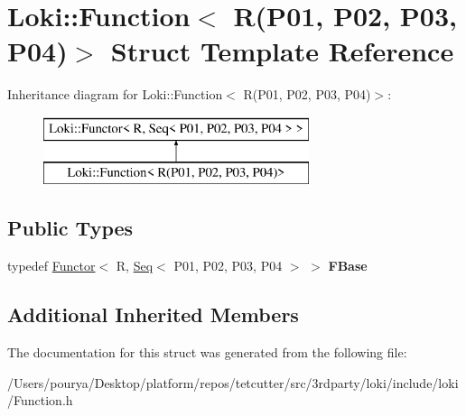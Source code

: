 \hypertarget{structLoki_1_1Function_3_01R_07P01_00_01P02_00_01P03_00_01P04_08_4}{}\section{Loki\+:\+:Function$<$ R(P01, P02, P03, P04)$>$ Struct Template Reference}
\label{structLoki_1_1Function_3_01R_07P01_00_01P02_00_01P03_00_01P04_08_4}
Inheritance diagram for Loki\+:\+:Function$<$ R(P01, P02, P03, P04)$>$\+:\begin{figure}[H]
\begin{center}
\leavevmode
\includegraphics[height=2.000000cm]{structLoki_1_1Function_3_01R_07P01_00_01P02_00_01P03_00_01P04_08_4}
\end{center}
\end{figure}
\subsection*{Public Types}
\begin{DoxyCompactItemize}
\item 
\hypertarget{structLoki_1_1Function_3_01R_07P01_00_01P02_00_01P03_00_01P04_08_4_aac4df1a7287af4c6488c69219dfef72b}{}typedef \hyperlink{classLoki_1_1Functor}{Functor}$<$ R, \hyperlink{structLoki_1_1Seq}{Seq}$<$ P01, P02, P03, P04 $>$ $>$ {\bfseries F\+Base}\label{structLoki_1_1Function_3_01R_07P01_00_01P02_00_01P03_00_01P04_08_4_aac4df1a7287af4c6488c69219dfef72b}

\end{DoxyCompactItemize}
\subsection*{Additional Inherited Members}


The documentation for this struct was generated from the following file\+:\begin{DoxyCompactItemize}
\item 
/\+Users/pourya/\+Desktop/platform/repos/tetcutter/src/3rdparty/loki/include/loki/Function.\+h\end{DoxyCompactItemize}
